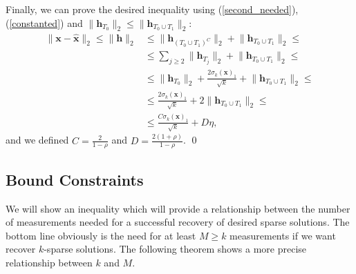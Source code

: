 \documentclass[11pt,oneside,czech,american]{book} %
\theoremstyle{definition} %
\newtheorem{thm}{Theorem}
\theoremstyle{definition}
\begin{document}
Finally, we can prove the desired inequality using (\ref{second_needed}), (\ref{constanted}) and $\lVert \bm{h}_{T_0} \rVert_2 \leq \lVert \bm{h}_{T_0 \cup T_1} \rVert_2$:
\begin{equation}
	\begin{aligned}
	\lVert \bm{x} - \bm{\hat{x}} \rVert_2 \leq \lVert \bm{h} \rVert_2 &\leq \lVert \bm{h}_{(T_0 \cup T_1)^C} \rVert_2 + \lVert \bm{h}_{T_0 \cup T_1} \rVert_2 \leq \\
	&\leq \sum_{j\geq 2} \lVert \bm{h}_{T_j} \rVert_2 + \lVert \bm{h}_{T_0 \cup T_1} \rVert_2 \leq \\
	&\leq \lVert \bm{h}_{T_0} \rVert_2 + \frac{ 2\sigma_k(\bm{x})_1}{\sqrt{k}} + \lVert \bm{h}_{T_0 \cup T_1} \rVert_2 \leq \\
	&\leq \frac{ 2\sigma_k(\bm{x})_1}{\sqrt{k}} + 2 \lVert \bm{h}_{T_0 \cup T_1} \rVert_2 \leq \\
	&\leq \frac{ C\sigma_k(\bm{x})_1}{\sqrt{k}} + D\eta,
	\end{aligned}
\end{equation}
and we defined $C = \frac{2}{1-\rho}$ and $D = \frac{2(1+\rho)}{1-\rho}$.
\qed

\subsection*{Bound Constraints}
We will show an inequality which will provide a relationship between the number of measurements needed for a successful recovery of desired sparse solutions. The bottom line obviously is the need for at least $M \geq k$ measurements if we want recover $k$-sparse solutions. The following theorem shows a more precise relationship between $k$ and $M$.


\end{document}
